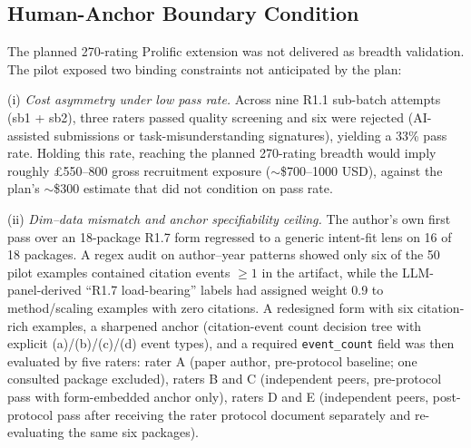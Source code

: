 \subsection{Human-Anchor Boundary Condition}
\label{sec:results:limitations:specifiability}

The planned 270-rating Prolific extension was not delivered as breadth validation. The pilot exposed two binding constraints not anticipated by the plan:

(i) \emph{Cost asymmetry under low pass rate.} Across nine R1.1 sub-batch attempts (sb1 + sb2), three raters passed quality screening and six were rejected (AI-assisted submissions or task-misunderstanding signatures), yielding a 33\% pass rate. Holding this rate, reaching the planned 270-rating breadth would imply roughly £550--800 gross recruitment exposure ($\sim$\$700--1000 USD), against the plan's $\sim$\$300 estimate that did not condition on pass rate.

(ii) \emph{Dim--data mismatch and anchor specifiability ceiling.} The author's own first pass over an 18-package R1.7 form regressed to a generic intent-fit lens on 16 of 18 packages. A regex audit on author--year patterns showed only six of the 50 pilot examples contained citation events $\geq 1$ in the artifact, while the LLM-panel-derived ``R1.7 load-bearing'' labels had assigned weight 0.9 to method/scaling examples with zero citations. A redesigned form with six citation-rich examples, a sharpened anchor (citation-event count decision tree with explicit (a)/(b)/(c)/(d) event types), and a required \texttt{event\_count} field was then evaluated by five raters: rater A (paper author, pre-protocol baseline; one consulted package excluded), raters B and C (independent peers, pre-protocol pass with form-embedded anchor only), raters D and E (independent peers, post-protocol pass after receiving the rater protocol document separately and re-evaluating the same six packages).

